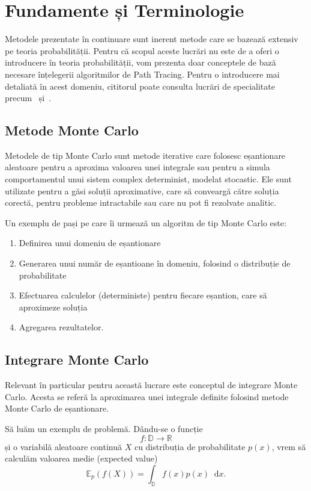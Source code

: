 \documentclass[12pt,a4paper]{report}
\newcommand*\diff{\mathop{}\!\mathrm{d}}
\numberwithin{equation}{section} %
\begin{document}
\section{Fundamente și Terminologie}

Metodele prezentate în continuare sunt inerent metode care se bazează extensiv
pe teoria probabilității. Pentru că scopul aceste lucrări nu este de a oferi o
introducere în teoria probabilității, vom prezenta doar conceptele de bază necesare
înțelegerii algoritmilor de Path Tracing. Pentru o introducere mai detaliată în
acest domeniu, cititorul poate consulta lucrări de specialitate precum~\cite{Halton}
și~\cite{Hammersley}.

\subsection{Metode Monte Carlo}

Metodele de tip Monte Carlo sunt metode
iterative care folosesc eșantionare aleatoare pentru a aproxima valoarea unei
integrale sau pentru a simula comportamentul unui sistem complex determinist,
modelat stocastic. Ele sunt utilizate pentru a găsi soluții aproximative, care
să conveargă către soluția corectă, pentru probleme intractabile sau care nu pot
fi rezolvate analitic.

Un exemplu de pași pe care îi urmează un algoritm de tip Monte Carlo este:
\begin{enumerate}
	\item Definirea unui domeniu de eșantionare
	\item Generarea unui număr de eșantioane în domeniu, folosind o distribuție de probabilitate
	\item Efectuarea calculelor (deterministe) pentru fiecare eșantion, care să aproximeze soluția
	\item Agregarea rezultatelor.
\end{enumerate}

\subsection{Integrare Monte Carlo}

Relevant în particular pentru această lucrare este conceptul de integrare Monte Carlo.
Acesta se referă la aproximarea unei integrale definite folosind metode Monte Carlo
de eșantionare.

Să luăm un exemplu de problemă. Dându-se o funcție $$f: \mathbb{D} \to \mathbb{R}$$
și o variabilă aleatoare continuă $X$ cu distribuția de probabilitate $p(x)$, vrem să calculăm
valoarea medie (expected value)
\begin{equation}\label{eq:expected_value}
	\mathbb{E}_p(f(X)) = \int_{\mathbb{D}} f(x) p(x)\diff x.
\end{equation}
\end{document}
